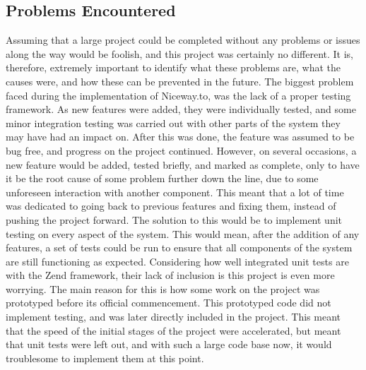 \subsection{Problems Encountered}
\label{sec:problems}
Assuming that a large project could be completed without any problems or issues along the way would be foolish, and this project was certainly no different. It is, therefore, extremely important to identify what these problems are, what the causes were, and how these can be prevented in the future. The biggest problem faced during the implementation of Niceway.to, was the lack of a proper testing framework. As new features were added, they were individually tested, and some minor integration testing was carried out with other parts of the system they may have had an impact on. After this was done, the feature was assumed to be bug free, and progress on the project continued. However, on several occasions, a new feature would be added, tested briefly, and marked as complete, only to have it be the root cause of some problem further down the line, due to some unforeseen interaction with another component. This meant that a lot of time was dedicated to going back to previous features and fixing them, instead of pushing the project forward. The solution to this would be to implement unit testing on every aspect of the system. This would mean, after the addition of any features, a set of tests could be run to ensure that all components of the system are still functioning as expected. Considering how well integrated unit tests are with the Zend framework, their lack of inclusion is this project is even more worrying. The main reason for this is how some work on the project was prototyped before its official commencement. This prototyped code did not implement testing, and was later directly included in the project. This meant that the speed of the initial stages of the project were accelerated, but meant that unit tests were left out, and with such a large code base now, it would troublesome to implement them at this point.\ \\
\ \\
